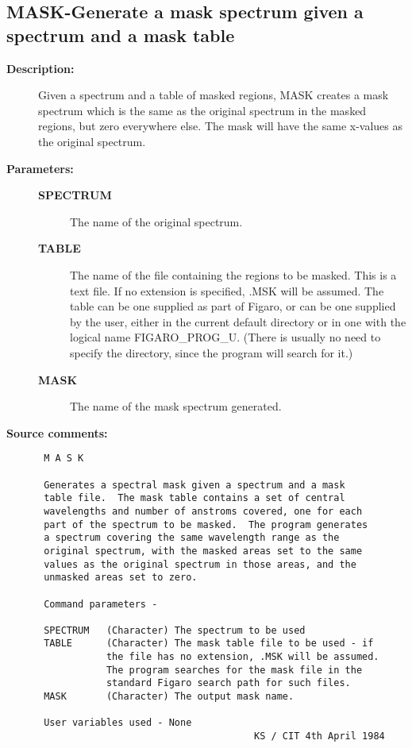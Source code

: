 \subsection{MASK-\label{MASK}Generate a mask spectrum given a spectrum and a mask table}
\begin{description}

\item [{\bf Description:}]
 Given a spectrum and a table of masked regions, MASK creates a
 mask spectrum which is the same as the original spectrum in the
 masked regions, but zero everywhere else.   The mask will have
 the same x-values as the original spectrum.

\item [{\bf Parameters:}]
\begin{description}
\item [{\bf SPECTRUM}]
 The name of the original spectrum.
\item [{\bf TABLE}]
 The name of the file containing the regions
 to be masked.  This is a text file.  If no extension is
 specified, .MSK will be assumed.  The table can be one
 supplied as part of Figaro, or can be one supplied by
 the user, either in the current default directory or
 in one with the logical name FIGARO_PROG_U.  (There is
 usually no need to specify the directory, since the
 program will search for it.)
\item [{\bf MASK}]
 The name of the mask spectrum generated.
\end{description}

\item [{\bf Source comments:}]
\begin{verbatim}
 M A S K

 Generates a spectral mask given a spectrum and a mask
 table file.  The mask table contains a set of central
 wavelengths and number of anstroms covered, one for each
 part of the spectrum to be masked.  The program generates
 a spectrum covering the same wavelength range as the
 original spectrum, with the masked areas set to the same
 values as the original spectrum in those areas, and the
 unmasked areas set to zero.

 Command parameters -

 SPECTRUM   (Character) The spectrum to be used
 TABLE      (Character) The mask table file to be used - if
            the file has no extension, .MSK will be assumed.
            The program searches for the mask file in the
            standard Figaro search path for such files.
 MASK       (Character) The output mask name.

 User variables used - None
                                      KS / CIT 4th April 1984
\end{verbatim}
\end{description}
